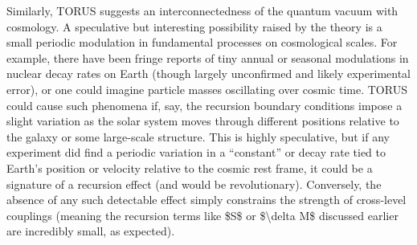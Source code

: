 \documentclass[
]{article}
\begin{document}
Similarly, TORUS suggests an interconnectedness of the quantum vacuum
with cosmology. A speculative but interesting possibility raised by the
theory is a small periodic modulation in fundamental processes on
cosmological scales. For example, there have been fringe reports of tiny
annual or seasonal modulations in nuclear decay rates on Earth (though
largely unconfirmed and likely experimental error), or one could imagine
particle masses oscillating over cosmic time. TORUS could cause such
phenomena if, say, the recursion boundary conditions impose a slight
variation as the solar system moves through different positions relative
to the galaxy or some large-scale structure. This is highly speculative,
but if any experiment did find a periodic variation in a ``constant'' or
decay rate tied to Earth's position or velocity relative to the cosmic
rest frame, it could be a signature of a recursion effect (and would be
revolutionary). Conversely, the absence of any such detectable effect
simply constrains the strength of cross-level couplings (meaning the
recursion terms like \$S\$ or \$\textbackslash delta M\$ discussed
earlier are incredibly small, as expected).
\end{document}
